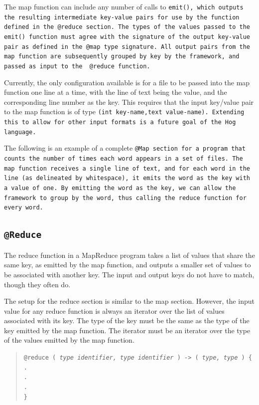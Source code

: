 \documentclass{article}
\begin{document}
The map function can include any number of calls to \tt emit()\rm, which outputs
the resulting intermediate key-value pairs for use by the function defined in the
\tt @reduce \rm section. The types of the values passed to the \tt emit() \rm
function must agree with the signature of the output key-value pair as defined in
the \tt @map \rm type signature. All output pairs from the map function are
subsequently grouped by key by the framework, and passed as input to the \tt
@reduce \rm function.

Currently, the only configuration available is for a file to be passed into the map
function one line at a time, with the line of text being the value, and the
corresponding line number as the key. This requires that the input key/value pair
to the map function is of type \tt (int key‐name,text value‐name)\rm. Extending
this to allow for other input formats is a future goal of the Hog language.

The following is an example of a complete \tt @Map \rm section for a program that
counts the number of times each word appears in a set of files. The map function
receives a single line of text, and for each word in the line (as delineated by
whitespace), it emits the word as the key with a value of one. By emitting the word
as the key, we can allow the framework to group by the word, thus calling the
reduce function for every word.


\subsection{\tt @Reduce \rm} %
\label{sub:tt_reduce_rm}

The reduce function in a MapReduce program takes a list of values that share the
same key, as emitted by the map function, and outputs a smaller set of values to be
associated with another key. The input and output keys do not have to match, though
they often do.

The setup for the reduce section is similar to the map section. However, the input
value for any reduce function is always an iterator over the list of values
associated with its key. The type of the key must be the same as the type of the
key emitted by the map function. The iterator must be an iterator over the type of
the values emitted by the map function.

\begin{quotation}
  \tt @reduce ( \rm \emph{type identifier, type identifier} \tt ) -> ( \rm \emph{type, type} \tt ) \{ \\
  \indent \indent . \\
  \indent \indent . \\
  \indent \indent . \\
  \indent \tt \} \rm
\end{quotation}
\end{document}
